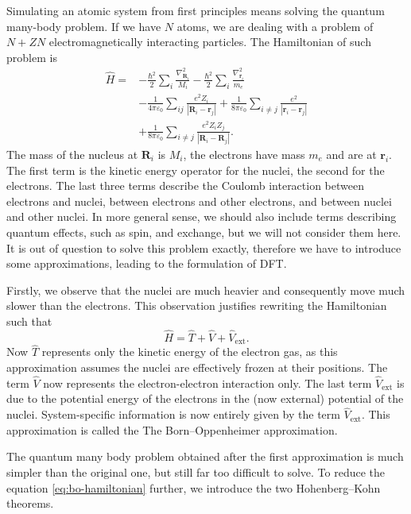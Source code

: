 Simulating an atomic system from first principles means solving the quantum
many-body problem. If we have $N$ atoms, we are dealing with a problem of
$N + ZN$ electromagnetically interacting particles. The Hamiltonian of such
problem is
\begin{equation}
\begin{alignedat}{2}
  \hat H = & - \frac{\hbar^2}{2} \sum_i \frac{\nabla^2_{\mathbf{R}_i}}{M_i}
  - \frac{\hbar^2}{2} \sum_i \frac{\nabla^2_{\mathbf{r}_i}}{m_e} \\
  & - \frac{1}{4 \pi \varepsilon_0} \sum_{ij} \frac{e^2 Z_i}{|\mathbf{R}_i - \mathbf{r}_j|}
  + \frac{1}{8 \pi \varepsilon_0} \sum_{i\neq j} \frac{e^2}{|\mathbf{r}_i - \mathbf{r}_j|} \\
  & + \frac{1}{8 \pi \varepsilon_0} \sum_{i \neq j} \frac{e^2 Z_i Z_j}{|\mathbf{R}_i - \mathbf{R}_j|}.
\end{alignedat}
\end{equation}
The mass of the nucleus at $\mathbf{R}_i$ is $M_i$, the electrons have mass
$m_e$ and are at $\mathbf{r}_i$. The first term is the kinetic energy operator
for the nuclei, the second for the electrons. The last three terms describe
the Coulomb interaction between electrons and nuclei, between electrons and
other electrons, and between nuclei and other nuclei. In more general sense,
we should also include terms describing quantum effects, such as spin, and 
exchange, but we will not consider them here. It is out of question to solve
this problem exactly, therefore we have to introduce some approximations,
leading to the formulation of DFT.

Firstly, we observe that the nuclei are much heavier and consequently move
much slower than the electrons. This observation justifies rewriting the
Hamiltonian such that
\begin{equation}
  \label{eq:bo-hamiltonian}
  \hat H = \hat T + \hat V + \hat V_\mathrm{ext}.
\end{equation}
Now $\hat T$ represents only the kinetic energy of the electron gas, as this
approximation assumes the nuclei are effectively frozen at their positions.
The term $\hat V$ now represents the electron-electron interaction only. The
last term $\hat V_\mathrm{ext}$ is due to the potential energy of the
electrons in the (now external) potential of the nuclei. System-specific
information is now entirely given by the term $\hat V_\mathrm{ext}$. This
approximation is called the The Born--Oppenheimer approximation.

The quantum many body problem obtained after the first approximation is much
simpler than the original one, but still far too difficult to solve. To reduce
the equation \eqref{eq:bo-hamiltonian} further, we introduce the two
Hohenberg--Kohn theorems.

